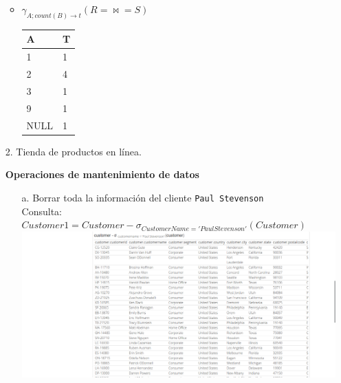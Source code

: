 \documentclass[12pt,a4paper]{article}
\begin{document}
\begin{enumerate}
\begin{itemize}
			\item $\gamma_{A ; count(B) \rightarrow t} (R =\bowtie= S)$\\
				\begin{tabular}{|l|l|}
					\hline
					A		&T\\
					\hline
					1		&1\\
					2		&4\\
					3		&1\\
					9		&1\\
					NULL	&1\\
					\hline
				\end{tabular}

		\end{itemize}


	\item[2.] Tienda de productos en línea.
	\pagebreak

		\textbf{Operaciones de mantenimiento de datos}\\
		\begin{enumerate}
			\item [a.] Borrar toda la información del cliente \texttt{Paul Stevenson}\\
				Consulta: $Customer1 = Customer - \sigma_{CustomerName='Paul Stevenson'}(Customer)$\\

				\includegraphics[scale=0.4]{assets/mantenimiento_datos-a.png}


\end{enumerate}
\end{enumerate}
\end{document}
